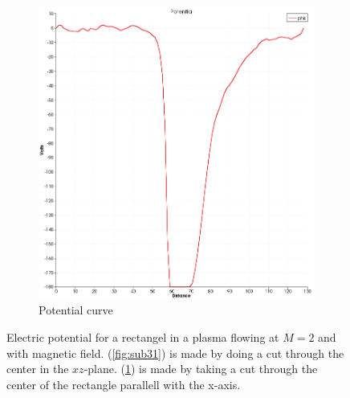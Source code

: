 \documentclass[twoside]{article}
\begin{document}
\begin{figure}[H]
\begin{subfigure}{.5\textwidth}
  \includegraphics[width=\linewidth]{phispot_1sim_kobe_B50.png}
  \caption{Potential curve}
  \label{fig:sub32}
\end{subfigure}
\caption{Electric potential for a rectangel in a plasma flowing at $M=2$ and with magnetic field. (\ref{fig:sub31}) is made by doing a cut through the center in the $xz$-plane. (\ref{fig:sub32}) is made by taking a cut through the center of the rectangle parallell with the x-axis.}
\label{fig:3}
\end{figure}
\end{document}
